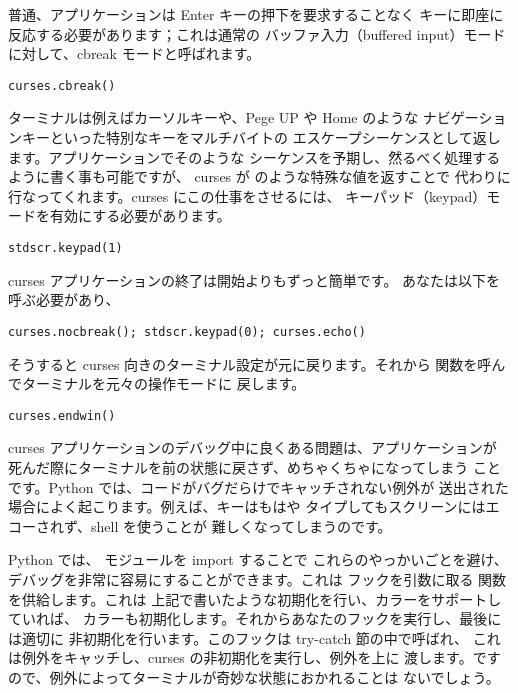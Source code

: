 \documentclass{howto}
\begin{document}
普通、アプリケーションは Enter キーの押下を要求することなく
キーに即座に反応する必要があります；これは通常の
バッファ入力（buffered input）モードに対して、cbreak モードと呼ばれます。

\begin{verbatim}
curses.cbreak()
\end{verbatim}

ターミナルは例えばカーソルキーや、Pege UP や Home のような
ナビゲーションキーといった特別なキーをマルチバイトの
エスケープシーケンスとして返します。アプリケーションでそのような
シーケンスを予期し、然るべく処理するように書く事も可能ですが、
curses が  のような特殊な値を返すことで
代わりに行なってくれます。curses にこの仕事をさせるには、
キーパッド（keypad）モードを有効にする必要があります。

\begin{verbatim}
stdscr.keypad(1)
\end{verbatim}

curses アプリケーションの終了は開始よりもずっと簡単です。
あなたは以下を呼ぶ必要があり、

\begin{verbatim}
curses.nocbreak(); stdscr.keypad(0); curses.echo()
\end{verbatim}

そうすると curses 向きのターミナル設定が元に戻ります。それから
 関数を呼んでターミナルを元々の操作モードに
戻します。

\begin{verbatim}
curses.endwin()
\end{verbatim}

curses アプリケーションのデバッグ中に良くある問題は、アプリケーションが
死んだ際にターミナルを前の状態に戻さず、めちゃくちゃになってしまう
ことです。Python では、コードがバグだらけでキャッチされない例外が
送出された場合によく起こります。例えば、キーはもはや
タイプしてもスクリーンにはエコーされず、shell を使うことが
難しくなってしまうのです。

Python では、 モジュールを import することで
これらのやっかいごとを避け、デバッグを非常に容易にすることができます。これは
フックを引数に取る  関数を供給します。これは
上記で書いたような初期化を行い、カラーをサポートしていれば、
カラーも初期化します。それからあなたのフックを実行し、最後には適切に
非初期化を行います。このフックは try-catch 節の中で呼ばれ、
これは例外をキャッチし、curses の非初期化を実行し、例外を上に
渡します。ですので、例外によってターミナルが奇妙な状態におかれることは
ないでしょう。
\end{document}
